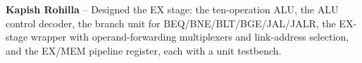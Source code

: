 \textbf{Kapish Rohilla} -- Designed the EX stage: the ten-operation ALU, the
ALU control decoder, the branch unit for BEQ/BNE/BLT/BGE/JAL/JALR, the EX-stage wrapper
with operand-forwarding multiplexers and link-address selection, and the EX/MEM pipeline
register, each with a unit testbench.
